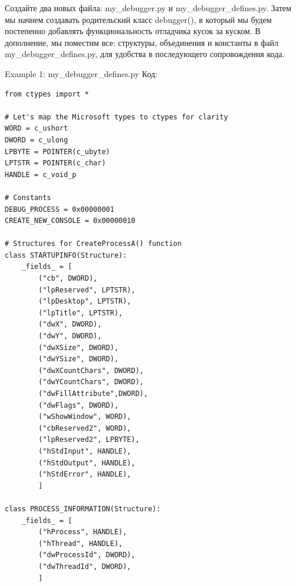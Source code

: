 \documentclass[12pt]{book}
\begin{document}
Создайте два новых файла: my\_debugger.py и my\_debugger\_defines.py. Затем мы начнем создавать родительский класс debugger(), в который мы будем постепенно добавлять функциональность отладчика кусок за куском. В дополнение, мы поместим все: структуры, объединения и константы в файл my\_debugger\_defines.py, для удобства в последующего сопровождения кода.

Example 1: my\_debugger\_defines.py
Код:
\begin{lstlisting}
from ctypes import *

# Let's map the Microsoft types to ctypes for clarity
WORD = c_ushort
DWORD = c_ulong
LPBYTE = POINTER(c_ubyte)
LPTSTR = POINTER(c_char)
HANDLE = c_void_p

# Constants
DEBUG_PROCESS = 0x00000001
CREATE_NEW_CONSOLE = 0x00000010

# Structures for CreateProcessA() function
class STARTUPINFO(Structure):
    _fields_ = [
        ("cb", DWORD),
        ("lpReserved", LPTSTR),
        ("lpDesktop", LPTSTR),
        ("lpTitle", LPTSTR),
        ("dwX", DWORD),
        ("dwY", DWORD),
        ("dwXSize", DWORD),
        ("dwYSize", DWORD),
        ("dwXCountChars", DWORD),
        ("dwYCountChars", DWORD),
        ("dwFillAttribute",DWORD),
        ("dwFlags", DWORD),
        ("wShowWindow", WORD),
        ("cbReserved2", WORD),
        ("lpReserved2", LPBYTE),
        ("hStdInput", HANDLE),
        ("hStdOutput", HANDLE),
        ("hStdError", HANDLE),
        ]

class PROCESS_INFORMATION(Structure):
    _fields_ = [
        ("hProcess", HANDLE),
        ("hThread", HANDLE),
        ("dwProcessId", DWORD),
        ("dwThreadId", DWORD),
        ]
\end{lstlisting}
\end{document}
